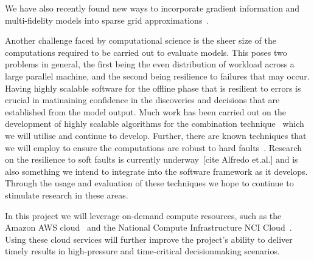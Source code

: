\documentclass[a4paper,fontsize=12pt]{scrartcl}
\begin{document}
We have also recently found new ways to incorporate gradient
information and multi-fidelity models into sparse grid
approximations~\parencite{deBaarHarding2015,Jakeman2015,deBaarRDM2015}.

Another challenge faced by computational science is the sheer size of
the computations required to be carried out to evaluate models. This
poses two problems in general, the first being the even distribution
of workload across a large parallel machine, and the second being
resilience to failures that may occur. Having highly scalable software
for the offline phase that is resilient to errors is crucial in
matinaining confidence in the discoveries and decisions that are
established from the model output. Much work has been carried out on
the development of highly scalable algorithms for the combination
technique~\parencite{StrazdinsEtal2015} which we will utilise and
continue to develop. Further, there are known techniques that we will
employ to ensure the computations are robust to hard
faults~\parencite{HardingHLS2015,AliEtal2015}. Research on the
resilience to soft faults is currently underway~[cite Alfredo et.al.]
and is also something we intend to integrate into the software
framework as it develops. Through the usage and evaluation of these
techniques we hope to continue to stimulate research in these areas.

In this project we will leverage on-demand compute resources, such as
the Amazon AWS cloud~\parencite{amazon_aws} and the National Compute
Infrastructure NCI Cloud~\parencite{nci_cloud}. Using these cloud
services will further improve the project's ability to deliver timely
results in high-pressure and time-critical decisionmaking scenarios.

\end{document}
